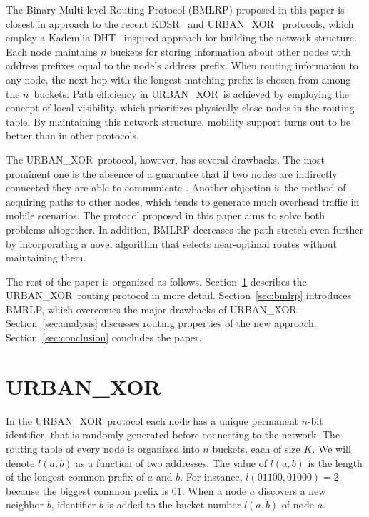 \documentclass[conference]{IEEEtran}
\theoremstyle{definition}
\newcommand{\urbanxor}{URBAN\_XOR}
\begin{document}
The Binary Multi-level Routing Protocol (BMLRP) proposed in this paper is closest in approach to the recent KDSR~\cite{kdsr} and \urbanxor~\cite{Pasquini} protocols, which employ a Kademlia DHT~\cite{kademlia} inspired approach for building the network structure. Each node maintains $n$ buckets for storing information about other nodes with address prefixes equal to the node's address prefix. When routing information to any node, the next hop with the longest matching prefix is chosen from among the $n$~buckets. Path efficiency 
in \urbanxor~is achieved by employing the concept of local visibility, which prioritizes physically close nodes in the routing table. By maintaining this network structure, mobility support turns out to be better than in other protocols.

The \urbanxor\ protocol, however, has several drawbacks. The most prominent one is the absence of a guarantee that if two nodes are indirectly connected they are able to communicate \cite{Pasquini}. Another objection is the method of acquiring paths to other nodes, which tends to generate much overhead traffic in mobile scenarios.  The protocol proposed in this paper aims to solve both problems altogether. In addition,  BMLRP decreases the path stretch even further by incorporating a novel algorithm that selects near-optimal routes without maintaining them.

The rest of the paper is organized as follows. Section~\ref{sec:urbanxor} describes the \urbanxor\ routing protocol in more detail. Section~\ref{sec:bmlrp} introduces BMRLP, which overcomes the major drawbacks of \urbanxor. 
Section~\ref{sec:analysis} discusses routing properties of the new approach. 
Section~\ref{sec:conclusion} concludes the paper.


\section{\urbanxor}
\label{sec:urbanxor}

In the \urbanxor\ protocol each node has a unique permanent $n$-bit identifier, that is randomly generated before connecting to the network. The routing table of every node is organized into $n$ buckets, each of size $K$. We will denote $l(a,b)$ as a function of two addresses. The value of $l(a,b)$ is the length of the longest common prefix of $a$ and $b$. For instance, $l(01100, 01000) = 2$ because the biggest common prefix is $01$. When a node $a$ discovers a new neighbor $b$, identifier $b$ is added to the bucket number $l(a,b)$ of node $a$.
\end{document}
